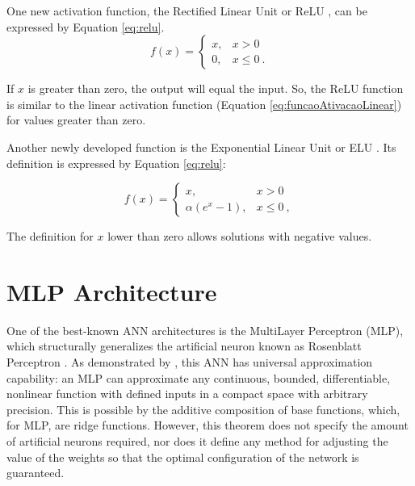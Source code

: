 One new activation function, the Rectified Linear Unit or ReLU \cite{Maas2013}, can be expressed by Equation \ref{eq:relu}.
\begin{equation}
	\label{eq:relu}
	f(x) = \left\{\begin{matrix}
		x, & x > 0    \\
		0, & x \leq 0 \:.
	\end{matrix}\right.
\end{equation}

\noindent
If $x$ is greater than zero, the output will equal the input. So, the ReLU function is similar to the linear activation function (Equation \ref{eq:funcaoAtivacaoLinear}) for values greater than zero. %

Another newly developed function is the Exponential Linear Unit or ELU \cite{Clevert2016}. Its definition is expressed by Equation \ref{eq:relu}:

\begin{equation}
	\label{eq:elu}
	f(x) = \left\{\begin{matrix}
		x,               & x > 0    \\
		\alpha(e^x - 1), & x \leq 0 \:,
	\end{matrix}\right.
\end{equation}

The definition for $x$ lower than zero allows solutions with negative values.

\section{MLP Architecture}
\label{sec:mlp}

One of the best-known ANN architectures is the MultiLayer Perceptron (MLP), which structurally generalizes the artificial neuron known as Rosenblatt Perceptron \cite{Rosenblatt1958}. As demonstrated by \cite{Cybenko1989}, this ANN has universal approximation capability: an MLP can approximate any continuous, bounded, differentiable, nonlinear function with defined inputs in a compact space with arbitrary precision. This is possible by the additive composition of base functions, which, for MLP, are ridge functions. However, this theorem does not specify the amount of artificial neurons required, nor does it define any method for adjusting the value of the weights so that the optimal configuration of the network is guaranteed.

